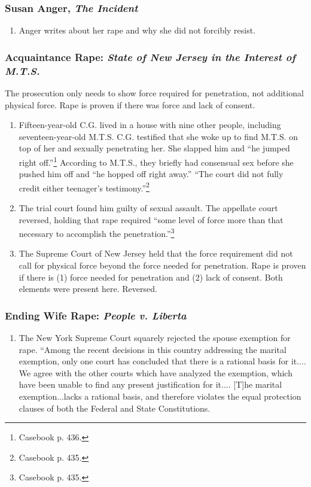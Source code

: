 \subsubsection{Susan Anger, \emph{The Incident}}

\begin{enumerate}
    \item Anger writes about her rape and why she did not forcibly resist.
\end{enumerate}

\subsubsection{Acquaintance Rape: \emph{State of New Jersey in the Interest of 
M.T.S.}}

The prosecution only needs to show force required for penetration, not 
additional physical force. Rape is proven if there was force and lack of 
consent.

\begin{enumerate}
    \item Fifteen-year-old C.G. lived in a house with nine other people, 
    including seventeen-year-old M.T.S. C.G. testified that she woke up to 
    find M.T.S. on top of her and sexually penetrating her. She slapped him 
    and ``he jumped right off.''\footnote{Casebook p. 436.} According to 
    M.T.S., they briefly had consensual sex before she pushed him off and 
    ``he hopped off right away.'' ``The court did not fully credit either 
    teenager's testimony.''\footnote{Casebook p. 435.}
    \item The trial court found him guilty of sexual assault. The appellate 
    court reversed, holding that rape required ``some level of force more than 
    that necessary to accomplish the penetration.''\footnote{Casebook p. 435.}
    \item The Supreme Court of New Jersey held that the force requirement did 
    not call for physical force beyond the force needed for penetration. Rape 
    is proven if there is (1) force needed for penetration and (2) lack of 
    consent. Both elements were present here. Reversed.
\end{enumerate}

\subsubsection{Ending Wife Rape: \emph{People v. Liberta}}

\begin{enumerate}
    \item The New York Supreme Court squarely rejected the spouse exemption 
    for rape.
    ``Among the recent decisions in this country addressing the marital 
    exemption, only one court has concluded that there is a rational basis for 
    it.... We agree with the other courts which have analyzed the exemption, 
    which have been unable to find any present justification for it.... [T]he 
    marital exemption...lacks a rational basis, and therefore violates the 
    equal protection clauses of both the Federal and State Constitutions.
\end{enumerate}

